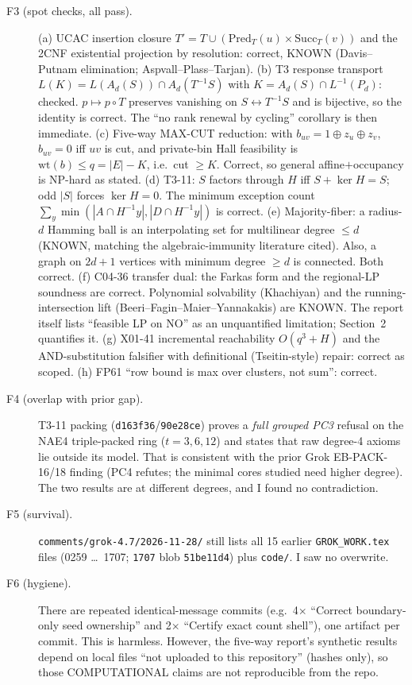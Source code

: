 \documentclass[11pt]{article}
\theoremstyle{remark}
\begin{document}
\begin{description}
\item[F3 (spot checks, all pass).]
(a) UCAC insertion closure $T'=T\cup(\mathrm{Pred}_T(u)\times\mathrm{Succ}_T(v))$ and the
2CNF existential projection by resolution: correct, KNOWN (Davis--Putnam elimination; Aspvall--Plass--Tarjan).
(b) T3 response transport $L(K)=L(A_d(S))\cap A_d(T^{-1}S)$ with $K=A_d(S)\cap L^{-1}(P_d)$:
checked. $p\mapsto p\circ T$ preserves vanishing on $S\leftrightarrow T^{-1}S$ and is bijective,
so the identity is correct. The ``no rank renewal by cycling'' corollary is then immediate.
(c) Five-way MAX-CUT reduction: with $b_{uv}=1\oplus z_u\oplus z_v$, $b_{uv}=0$ iff $uv$ is cut,
and private-bin Hall feasibility is $\mathrm{wt}(b)\le q=|E|-K$, i.e.\ cut $\ge K$. Correct, so general
affine$+$occupancy is NP-hard as stated.
(d) T3-11: $S$ factors through $H$ iff $S+\ker H=S$; odd $|S|$ forces $\ker H=0$. The minimum
exception count $\sum_y\min(|A\cap H^{-1}y|,|D\cap H^{-1}y|)$ is correct.
(e) Majority-fiber: a radius-$d$ Hamming ball is an interpolating set for multilinear degree
$\le d$ (KNOWN, matching the algebraic-immunity literature cited). Also, a graph on $2d+1$ vertices
with minimum degree $\ge d$ is connected. Both correct.
(f) C04-36 transfer dual: the Farkas form and the regional-LP soundness are correct. Polynomial
solvability (Khachiyan) and the running-intersection lift (Beeri--Fagin--Maier--Yannakakis) are
KNOWN. The report itself lists ``feasible LP on NO'' as an unquantified limitation; Section~2
quantifies it.
(g) X01-41 incremental reachability $O(q^3+H)$ and the AND-substitution falsifier with definitional
(Tseitin-style) repair: correct as scoped.
(h) FP61 ``row bound is max over clusters, not sum'': correct.
\item[F4 (overlap with prior gap).] T3-11 packing (\texttt{d163f36}/\texttt{90e28ce}) proves a
\emph{full grouped PC3} refusal on the NAE4 triple-packed ring ($t=3,6,12$) and states that raw
degree-4 axioms lie outside its model. That is consistent with the prior Grok EB-PACK-16/18 finding
(PC4 refutes; the minimal cores studied need higher degree). The two results are at different
degrees, and I found no contradiction.
\item[F5 (survival).] \texttt{comments/grok-4.7/2026-11-28/} still lists all 15 earlier
\texttt{GROK\_WORK.tex} files (0259 \ldots\ 1707; \texttt{1707} blob \texttt{51be11d4}) plus \texttt{code/}.
I saw no overwrite.
\item[F6 (hygiene).] There are repeated identical-message commits (e.g.\ 4$\times$ ``Correct boundary-only
seed ownership'' and 2$\times$ ``Certify exact count shell''), one artifact per commit. This is harmless.
However, the five-way report's synthetic results depend on local files ``not uploaded to this
repository'' (hashes only), so those COMPUTATIONAL claims are not reproducible from the repo.
\end{description}
\end{document}
